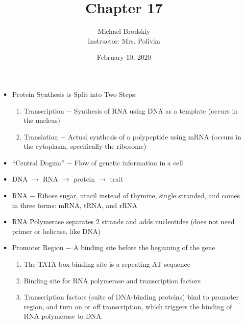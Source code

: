 \documentclass[12pt]{article}
\title{Chapter 17}
\date{February 10, 2020}
\author{Michael Brodskiy\\ \small Instructor: Mrs. Polivka}
\begin{document}
\maketitle

\begin{itemize}

  \item Protein Synthesis is Split into Two Steps:

    \begin{enumerate}

      \item Transcription $-$ Synthesis of RNA using DNA as a template (occurs in the nucleus)

      \item Translation $-$ Actual synthesis of a polypeptide using mRNA (occurs in the cytoplasm, specifically the ribosome)

    \end{enumerate}

  \item ``Central Dogma'' $-$ Flow of genetic information in a cell

  \item DNA $\rightarrow$ RNA $\rightarrow$ protein $\rightarrow$ trait

  \item RNA $-$ Ribose sugar, uracil instead of thymine, single stranded, and comes in three forms: mRNA, tRNA, and rRNA

  \item RNA Polymerase separates 2 strands and adds nucleotides (does not need primer or helicase, like DNA)

  \item Promoter Region $-$ A binding site before the beginning of the gene

    \begin{enumerate}

  \item The TATA box binding site is a repeating AT sequence

  \item Binding site for RNA polymerase and transcription factors

  \item Transcription factors (suite of DNA-binding proteins) bind to promoter region, and turn on or off transcription, which triggers the binding of RNA polymerase to DNA

\end{enumerate}


\end{itemize}
\end{document}
